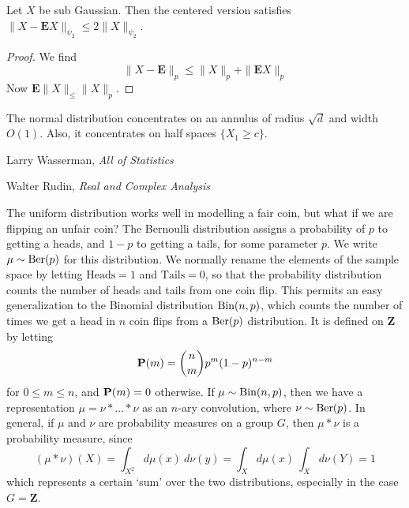\begin{theorem}
    Let $X$ be sub Gaussian. Then the centered version satisfies $\| X - \mathbf{E} X \|_{\psi_2} \leq 2 \| X \|_{\psi_2}$.
\end{theorem}
\begin{proof}
    We find
    \[ \| X - \mathbf{E} \|_p \leq \|X \|_p + \| \mathbf{E} X \|_p \]
    Now $\mathbf{E} \|X \|_ \leq \| X \|_p$.
\end{proof}

The normal distribution concentrates on an annulus of radius $\sqrt{d}$ and width $O(1)$. Also, it concentrates on half spaces $\{ X_1 \geq c \}$.



\begin{thebibliography}{10}
     Larry Wasserman,
    \emph{All of Statistics}

     Walter Rudin,
    \emph{Real and Complex Analysis}
\end{thebibliography}













\begin{example}
    The uniform distribution works well in modelling a fair coin, but what if we are flipping an unfair coin? The Bernoulli distribution assigns a probability of $p$ to getting a heads, and $1-p$ to getting a tails, for some parameter $p$. We write $\mu \sim \text{Ber}(p)$ for this distribution. We normally rename the elements of the sample space by letting $\text{Heads} = 1$ and $\text{Tails} = 0$, so that the probability distribution counts the number of heads and tails from one coin flip. This permits an easy generalization to the Binomial distribution $\text{Bin}(n,p)$, which counts the number of times we get a head in $n$ coin flips from a $\text{Ber}(p)$ distribution. It is defined on $\mathbf{Z}$ by letting
    \[ \mathbf{P}(m) = \binom{n}{m} p^m (1-p)^{n-m} \]
    for $0 \leq m \leq n$, and $\mathbf{P}(m) = 0$ otherwise. If $\mu \sim \text{Bin}(n,p)$, then we have a representation $\mu = \nu * \dots * \nu$ as an $n$-ary convolution, where $\nu \sim \text{Ber}(p)$. In general, if $\mu$ and $\nu$ are probability measures on a group $G$, then $\mu * \nu$ is a probability measure, since
    \[ (\mu * \nu)(X) = \int_{X^2} d\mu(x)\ d\nu(y) = \int_X d\mu(x) \ \int_X d\nu(Y) = 1 \]
    which represents a certain `sum' over the two distributions, especially in the case $G = \mathbf{Z}$.
\end{example}

